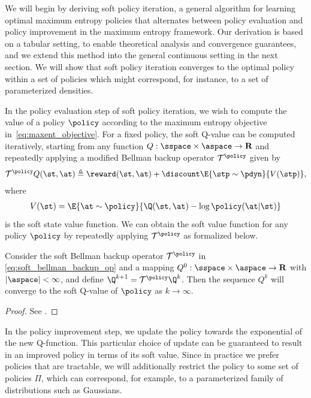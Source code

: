 \documentclass{article}
\begin{document}
We will begin by deriving soft policy iteration, a general algorithm for learning optimal maximum entropy policies that alternates between policy evaluation and policy improvement in the maximum entropy framework. Our derivation is based on a tabular setting, to enable theoretical analysis and convergence guarantees, and we extend this method into the general continuous setting in the next section. We will show that soft policy iteration converges to the optimal policy within a set of policies which might correspond, for instance, to a set of parameterized densities.

In the policy evaluation step of soft policy iteration, we wish to compute the value of a policy $\policy$ according to the maximum entropy objective in~\autoref{eq:maxent_objective}. For a fixed policy, the soft Q-value can be computed iteratively, starting from any function $Q: \sspace\times \aspace \rightarrow \reals$ and repeatedly applying a modified Bellman backup operator $\mathcal{T}^\policy$ given by
\begin{align}
\label{eq:soft_bellman_backup_op}
\mathcal{T}^\policy Q(\st, \at) \triangleq  \reward(\st, \at) + \discount \E{\stp \sim \pdyn}{V(\stp)},
\end{align}
where
\begin{align}
V(\st) = \E{\at\sim\policy}{\Q(\st, \at) - \log\policy(\at|\st)}
\label{eq:soft_value_function}
\end{align}
is the soft state value function. We can obtain the soft value function for any policy $\policy$ by repeatedly applying $\mathcal{T}^\policy$ as formalized below.
\begin{lemma}
\label{lem:soft_policy_evaluation}
Consider the soft Bellman backup operator $\mathcal{T}^\policy$ in \autoref{eq:soft_bellman_backup_op} and a mapping $Q^0: \sspace \times \aspace\rightarrow \reals$ with $|\aspace|<\infty$, and define $\Q^{k+1} = \mathcal{T}^\policy \Q^k$. Then the sequence $Q^k$ will converge to the soft Q-value of $\policy$ as $k\rightarrow \infty$.
\begin{proof}
See .
\end{proof}
\end{lemma}
In the policy improvement step, we update the policy towards the exponential of the new Q-function. This particular choice of update can be guaranteed to result in an improved policy in terms of its soft value.
%
Since in practice we prefer policies that are tractable, we will additionally restrict the policy to some set of policies $\Pi$, which can correspond, for example, to a parameterized family of distributions such as Gaussians. 
\end{document}
